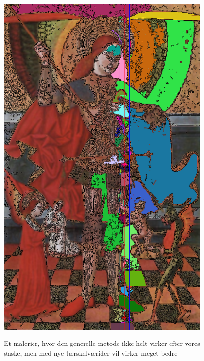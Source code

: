 \begin{figure}[!h]
{        \includegraphics[angle=270,width=0.95\textwidth]{afsnit/afprovning/billeder/thressholds/krafitige_farver/krafite_detalier/s7_e200_f5.png}
        \label{GRD_virker_nesten1_super}}\\
     \caption[]{Et malerier, hvor den generelle metode ikke helt virker efter vores ønske, men med nye tærskelværider vil virker meget bedre}
     \label{generelde_region_detektor_virker_nesten1}
\end{figure}


